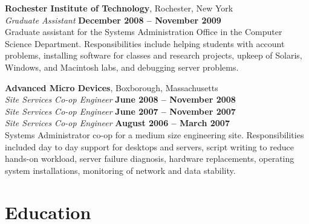 \documentclass[margin,line]{resume}
\begin{document}
\begin{resume}
    \textbf{Rochester Institute of Technology}, Rochester, New York \vspace{2mm}\\\vspace{1mm}%
    \textsl{Graduate Assistant} \hfill \textbf{December 2008 -- November 2009}\\
    Graduate assistant for the Systems Administration Office in the Computer
    Science Department. Responsibilities include helping students with account
    problems, installing software for classes and research projects, upkeep
    of Solaris, Windows, and Macintosh labs, and debugging server problems.

    \textbf{Advanced Micro Devices}, Boxborough, Massachusetts \vspace{2mm}\\\vspace{1mm}%
    \textsl{Site Services Co-op Engineer} \hfill \textbf{June 2008 -- November 2008}\\\vspace{0.5mm}%
    \textsl{Site Services Co-op Engineer} \hfill \textbf{June 2007 -- November 2007}\\\vspace{0.5mm}%
    \textsl{Site Services Co-op Engineer} \hfill \textbf{August 2006 -- March 2007}\\\vspace{0.5mm}%
    Systems Administrator co-op for a medium size engineering site. Responsibilities included day to day 
    support for desktops and servers, script writing to reduce hands-on workload, server failure diagnosis,
    hardware replacements, operating system installations, monitoring of network and data stability. 

    \section{\mysidestyle Education}


\end{resume}
\end{document}

